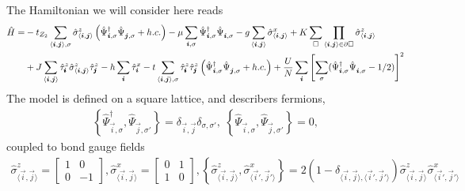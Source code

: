 \label{Z2.Sec}
The Hamiltonian we will consider here reads
\begin{align}
	\hat{H} =& -  t_{Z_2} \sum_{\langle \vec{i}, \vec{j} \rangle, \sigma } \hat{\sigma}^z_{\langle \vec{i}, \vec{j} \rangle}
	\left(\hat{\Psi}^{\dagger}_{\vec{i},\sigma} \hat{\Psi}^{\phantom{\dagger}}_{\vec{j},\sigma}   + h.c. \right) - \mu \sum_{\vec{i},\sigma} \hat{\Psi}^{\dagger}_{\vec{i},\sigma} \hat{\Psi}^{\phantom{\dagger}}_{\vec{i},\sigma}  
	-g \sum_{\langle \vec{i}, \vec{j} \rangle } \hat{\sigma}^{x}_{\langle \vec{i}, \vec{j} \rangle }  +
	  K \sum_{\square} \prod_{\langle \vec{i}, \vec{j} \rangle \in \partial \square} \hat{\sigma}^{z}_{\langle \vec{i}, \vec{j} \rangle}  \nonumber \\
	& + J  \sum_{\langle \vec{i}, \vec{j} \rangle}  \hat{\tau}^z_{\pmb{i}}  \hat{\sigma}^{z}_{\langle \vec{i}, \vec{j} \rangle} \hat{\tau}^z_{\pmb{j}}   
	      -  h \sum_{ \vec{i} } \hat{\tau}^x_{\vec{i}}   - t  \sum_{\langle \vec{i}, \vec{j} \rangle, \sigma }   \hat{\tau}^z_{\pmb{i}}   \hat{\tau}^z_{\pmb{j}}  \left( \hat{\Psi}^{\dagger}_{\vec{i},\sigma} \hat{\Psi}^{\phantom{\dagger}}_{\vec{j},\sigma} 	+ h.c. \right) + \frac{U}{N}\sum_{\ve{i}} \left[ \sum_{\sigma}  ( \hat{\Psi}^{\dagger}_{\ve{i},\sigma}  \hat{\Psi}^{\phantom\dagger}_{\ve{i},\sigma} - 1/2 ) \right]^2 
\end{align}  
The model is defined on a square lattice, and describers fermions, 
\begin{align}
 \left\{ \hat{\Psi}^{\dagger}_{\vec{i},\sigma},  \hat{\Psi}^{\phantom\dagger}_{\vec{j},\sigma'} \right\}  = \delta_{\vec{i},\vec{j}} \delta_{\sigma,\sigma'}, \;  
\left\{ \hat{\Psi}^{\phantom\dagger}_{\vec{i},\sigma},  \hat{\Psi}^{\phantom\dagger}_{\vec{j},\sigma'} \right\}  =  0,  
\end{align}
coupled to  bond gauge fields 
\begin{align}
\hat{\sigma}^{z}_{\langle \vec{i}, \vec{j} \rangle}  = 
\begin{bmatrix}
1 & 0 \\
0 & -1 
\end{bmatrix},  
\hat{\sigma}^x_{\langle \vec{i}, \vec{j} \rangle}  = 
\begin{bmatrix}
0 & 1 \\
1 & 0 
\end{bmatrix},   
\left\{ \hat{\sigma}^{z}_{\langle \vec{i}, \vec{j} \rangle} , \hat{\sigma}^x_{\langle \vec{i}', \vec{j}'  \rangle} \right\}  =  2 \left( 1 -  \delta_{\langle \vec{i}, \vec{j}  \rangle, \langle \vec{i}', \vec{j}'  \rangle } \right) 
\hat{\sigma}^{z}_{\langle \vec{i}, \vec{j} \rangle}  \hat{\sigma}^x_{\langle \vec{i}', \vec{j}'  \rangle}
\end{align}
